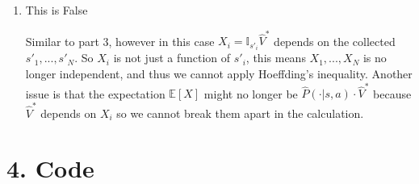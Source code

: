 \documentclass[10pt]{report}
\begin{document}
\begin{enumerate}
	\item
	This is False

	Similar to part 3, however in this case $X_i = \mathbb{I}_{s'_i} \widehat{V}^*$ depends on the collected $s'_1, ..., s'_N$. So $X_i$ is not just a function of $s'_i$, this means $X_1, ..., X_N$ is no longer independent, and thus we cannot apply Hoeffding's inequality. Another issue is that the expectation $\mathbb{E}[X]$ might no longer be $\widehat{P}(\cdot | s, a) \cdot \widehat{V}^*$ because $\widehat{V}^*$ depends on $X_i$ so we cannot break them apart in the calculation. 
\end{enumerate}



\newpage
\section*{4. Code}
\end{document}
